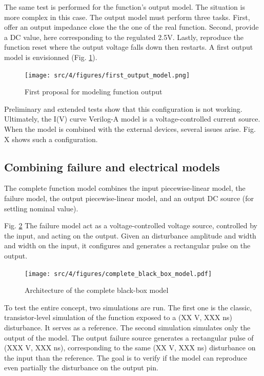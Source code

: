 The same test is performed for the function's output model.
The situation is more complex in this case.
The output model must perform three tasks.
First, offer an output impedance close the the one of the real function.
Second, provide a DC value, here corresponding to the regulated 2.5V.
Lastly, reproduce the function reset where the output voltage falls down then restarts.
A first output model is envisionned (Fig. \ref{fig:first-output-model}).

\begin{figure}[!h]
  \centering
  \texttt{[image: src/4/figures/first\_output\_model.png]}
  \caption{First proposal for modeling function output}
  \label{fig:first-output-model}
\end{figure}

Preliminary and extended tests show that this configuration is not working.
Ultimately, the I(V) curve Verilog-A model is a voltage-controlled current source.
When the model is combined with the external devices, several issues arise.
Fig. X shows such a configuration.




\subsection{Combining failure and electrical models}

The complete function model combines the input piecewise-linear model, the failure model, the output piecewise-linear model, and an output DC source (for settling nominal value).

Fig. \ref{fig:complete-black-box-model}
The failure model act as a voltage-controlled voltage source, controlled by the input, and acting on the output.
Given an disturbance amplitude and width and width on the input, it configures and generates a rectangular pulse on the output.

\begin{figure}[!h]
  \centering
  \texttt{[image: src/4/figures/complete\_black\_box\_model.pdf]}
  \caption{Architecture of the complete black-box model}
  \label{fig:complete-black-box-model}
\end{figure}

To test the entire concept, two simulations are run.
The first one is the classic, transistor-level simulation of the function exposed to a (XX V, XXX ns) disturbance.
It serves as a reference.
The second simulation simulates only the output of the model.
The output failure source generates a rectangular pulse of (XXX V, XXX ns), corresponding to the same (XX V, XXX ns) disturbance on the input than the reference.
The goal is to verify if the model can reproduce even partially the disturbance on the output pin.

